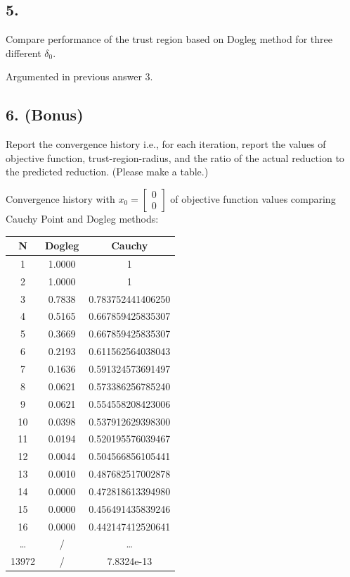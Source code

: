 \documentclass[unicode,11pt,a4paper,oneside,numbers=endperiod,openany]{scrartcl}
\newcommand{\myvec}[1]{\begin{bmatrix} #1 \end{bmatrix}}
\begin{document}
\subsection*{5.}
Compare performance of the trust region based on Dogleg method for three different $\delta_0$. \\\newline

Argumented in previous answer 3.

\subsection*{6. (Bonus)}
Report the convergence history i.e., for each iteration, report the values of objective
function, trust-region-radius, and the ratio of the actual reduction to the predicted reduction.
(Please make a table.) \\\newline


Convergence history with $x_0 = \myvec{0 \\ 0}$ of objective function values 
comparing Cauchy Point and Dogleg methods: \\\newline

\begin{tabular}{|c|c|c|}
    \hline
    N & \textbf{Dogleg} & \textbf{Cauchy}  \\
    \hline
    1 & 1.0000 & 1 \\
    2 & 1.0000 & 1 \\
   3 & 0.7838 & 0.783752441406250 \\
    4 & 0.5165 & 0.667859425835307 \\
    5 & 0.3669 & 0.667859425835307 \\
    6 & 0.2193 & 0.611562564038043 \\
    7 & 0.1636 & 0.591324573691497 \\
    8 & 0.0621 & 0.573386256785240 \\
    9 & 0.0621 & 0.554558208423006 \\
    10 & 0.0398 & 0.537912629398300 \\
    11 & 0.0194 & 0.520195576039467 \\
    12 & 0.0044 & 0.504566856105441 \\
    13 & 0.0010 & 0.487682517002878 \\
    14 & 0.0000 & 0.472818613394980 \\
    15 & 0.0000 & 0.456491435839246 \\
    16 & 0.0000 & 0.442147412520641 \\
    \ldots & / & \ldots \\
    13972 & / & 7.8324e-13\\
    \hline
\end{tabular}
\end{document}

